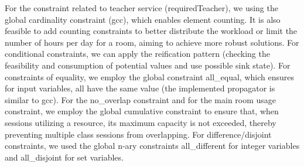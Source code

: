 For the constraint related to teacher service (requiredTeacher), we using the global cardinality constraint (gcc), which enables element counting. It is also feasible to add counting constraints to better distribute the workload or limit the number of hours per day for a room, aiming to achieve more robust solutions. For conditional constraints, we can apply the reification pattern (checking the feasibility and consumption of potential values and use possible sink state). For constraints of equality, we employ the global constraint all\_equal, which ensures for input variables, all have the same value (the implemented propagator is similar to gcc).
For the no\_overlap constraint and for the main room usage constraint, we employ the global cumulative constraint to ensure that, when sessions utilizing a resource, its maximum capacity is not exceeded, thereby preventing multiple class sessions from overlapping.
For difference/disjoint constraints, we used the global n-ary constraints all\_different for integer variables and all\_disjoint for set variables.
%
%
%
%
%
%
